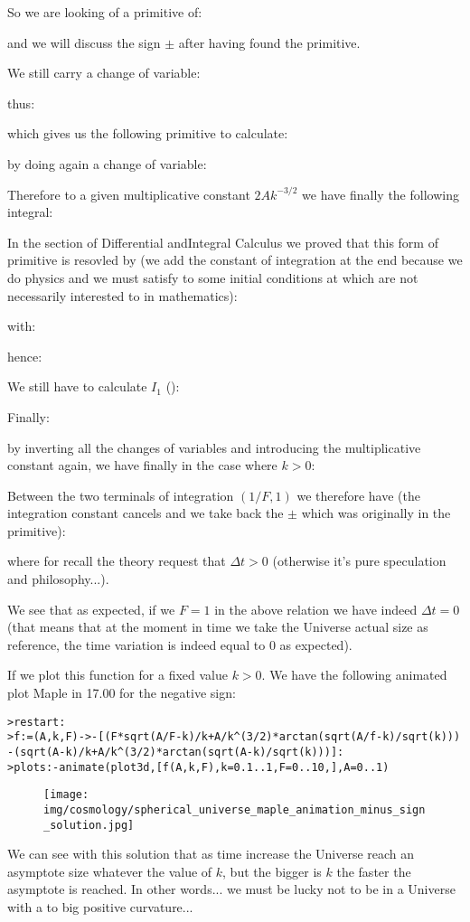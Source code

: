 	So we are looking of a primitive of:
	
	and we will discuss the sign $\pm$ after having found the primitive.

	We still carry a change of variable:
	
	thus:
	
 	which gives us the following primitive to calculate:
	
	by doing again a change of variable:
	
	Therefore to a given multiplicative constant $2Ak^{-3/2}$ we have finally the following integral:
	
	In the section of Differential andIntegral Calculus we proved that this form of primitive is resovled by (we add the constant of integration at the end because we do physics and we must satisfy to some initial conditions at which are not necessarily interested to in mathematics):
	
	with:
	
	hence:
	
	We still have to calculate $I_1$ ():
	
	Finally:
	
	by inverting all the changes of variables and introducing the multiplicative constant again, we have finally in the case where $k>0$:
	
	Between the two terminals of integration $(1/F,1)$ we therefore have (the integration constant cancels and we take back the $\pm$ which was originally in the primitive):
	
	where for recall the theory request that $\Delta t>0$ (otherwise it's pure speculation and philosophy...).
	
	We see that as expected, if we $F=1$ in the above relation we have indeed $\Delta t=0$ (that means that at the moment in time we take the Universe actual size as reference, the time variation is indeed equal to $0$ as expected).
	
	If we plot this function for a fixed value $k>0$. We have the following  animated plot Maple in 17.00 for the negative sign:
	
	\texttt{>restart:\\
	>f:=(A,k,F)->-[(F*sqrt(A/F-k)/k+A/k\string^(3/2)*arctan(sqrt(A/f-k)/sqrt(k)))\\
	-(sqrt(A-k)/k+A/k\string^(3/2)*arctan(sqrt(A-k)/sqrt(k)))]:\\
	>plots:-animate(plot3d,[f(A,k,F),k=0.1..1,F=0..10,],A=0..1)
	}
	\begin{figure}[H]
		\begin{center}
		\texttt{[image: img/cosmology/spherical\_universe\_maple\_animation\_minus\_sign\_solution.jpg]}
		\end{center}
	\end{figure}
	We can see with this solution that as time increase the Universe reach an asymptote size whatever the value of $k$, but the bigger is $k$ the faster the asymptote is reached. In other words... we must be lucky not to be in a Universe with a to big positive curvature...
	
